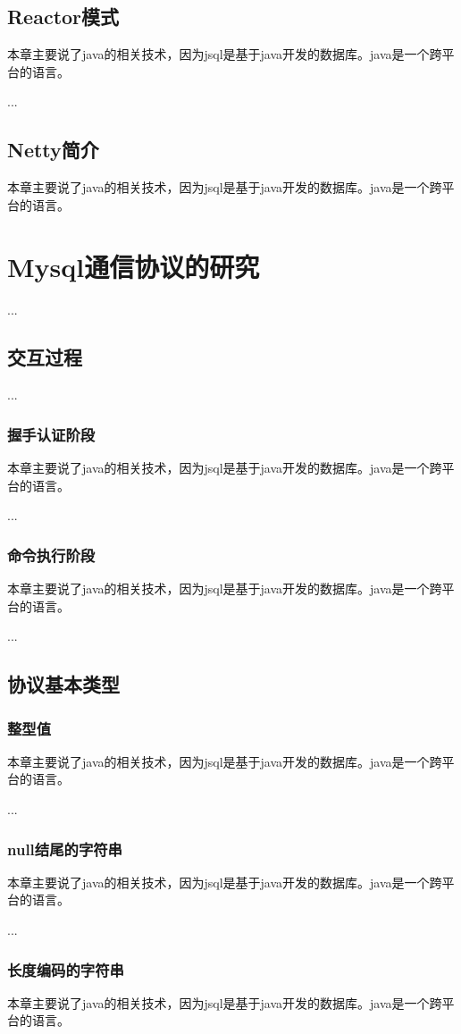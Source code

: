 \subsection{Reactor模式}
本章主要说了java的相关技术，因为jsql是基于java开发的数据库。java是一个跨平台的语言。

...
\subsection{Netty简介}
本章主要说了java的相关技术，因为jsql是基于java开发的数据库。java是一个跨平台的语言。
\section{Mysql通信协议的研究}
...
\subsection{交互过程}
...
\subsubsection*{握手认证阶段}
本章主要说了java的相关技术，因为jsql是基于java开发的数据库。java是一个跨平台的语言。

...
\subsubsection*{命令执行阶段}
本章主要说了java的相关技术，因为jsql是基于java开发的数据库。java是一个跨平台的语言。

...
\subsection{协议基本类型}
\subsubsection*{整型值}
本章主要说了java的相关技术，因为jsql是基于java开发的数据库。java是一个跨平台的语言。

...
\subsubsection*{null结尾的字符串}
本章主要说了java的相关技术，因为jsql是基于java开发的数据库。java是一个跨平台的语言。

...
\subsubsection*{长度编码的字符串}
本章主要说了java的相关技术，因为jsql是基于java开发的数据库。java是一个跨平台的语言。

